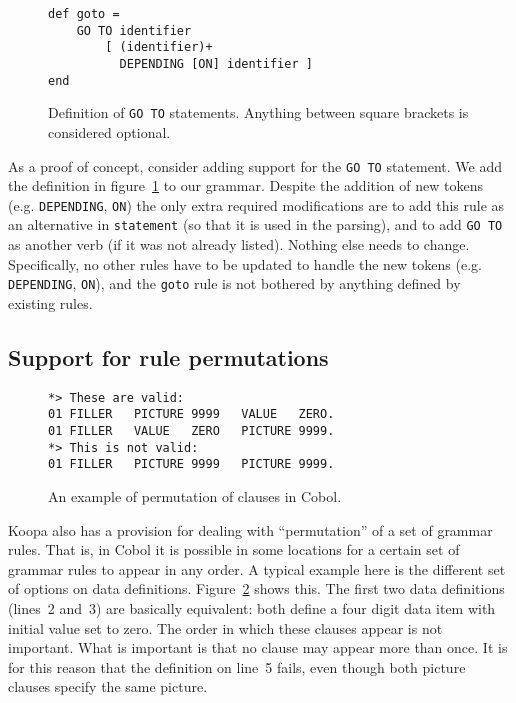 \documentclass[a4paper]{article}
\begin{document}
\begin{figure}
\centering
\label{fig:koopa-grammar}
\begin{lstlisting}
def goto =
    GO TO identifier
        [ (identifier)+
          DEPENDING [ON] identifier ]
end
\end{lstlisting}
\caption{Definition of \lstinline|GO TO| statements. Anything between square brackets is considered optional.}
\label{fig:koopa-goto-rule}
\end{figure}

As a proof of concept, consider adding support for the \lstinline|GO TO| statement. We add the definition in figure~\ref{fig:koopa-goto-rule} to our grammar. Despite the addition of new tokens (e.g. \lstinline|DEPENDING|, \lstinline|ON|) the only extra required modifications are to add this rule as an alternative in \lstinline|statement| (so that it is used in the parsing), and to add \lstinline|GO TO| as another verb (if it was not already listed). Nothing else needs to change. Specifically, no other rules have to be updated to handle the new tokens (e.g. \lstinline|DEPENDING|, \lstinline|ON|), and the \lstinline|goto| rule is not bothered by anything defined by existing rules.


\subsection{Support for rule permutations}

\begin{figure}
\centering
\begin{lstlisting}
*> These are valid:
01 FILLER   PICTURE 9999   VALUE   ZERO.
01 FILLER   VALUE   ZERO   PICTURE 9999.
*> This is not valid:
01 FILLER   PICTURE 9999   PICTURE 9999.
\end{lstlisting}
\caption{An example of permutation of clauses in Cobol.}
\label{fig:permutation-example}
\end{figure}

Koopa also has a provision for dealing with ``permutation'' of a set of grammar rules. That is, in Cobol it is possible in some locations for a certain set of grammar rules to appear in any order. A typical example here is the different set of options on data definitions. Figure~\ref{fig:permutation-example} shows this. The first two data definitions (lines~2 and~3) are basically equivalent: both define a four digit data item with initial value set to zero. The order in which these clauses appear is not important. What is important is that no clause may appear more than once. It is for this reason that the definition on line~5 fails, even though both picture clauses specify the same picture.
\end{document}

